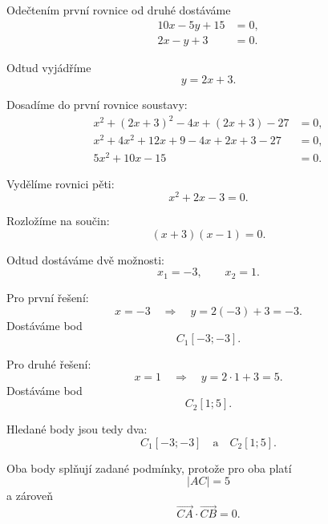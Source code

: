 \begin{example}
    Odečtením první rovnice od druhé dostáváme
    \begin{align*}
        10x-5y+15&=0,\\
        2x-y+3&=0.
    \end{align*}

    Odtud vyjádříme
    \[
        y=2x+3.
    \]

    Dosadíme do první rovnice soustavy:
    \begin{align*}
        x^2+(2x+3)^2-4x+(2x+3)-27&=0,\\
        x^2+4x^2+12x+9-4x+2x+3-27&=0,\\
        5x^2+10x-15&=0.
    \end{align*}

    Vydělíme rovnici pěti:
    \[
        x^2+2x-3=0.
    \]

    Rozložíme na součin:
    \[
        (x+3)(x-1)=0.
    \]

    Odtud dostáváme dvě možnosti:
    \[
        x_1=-3,
        \qquad
        x_2=1.
    \]

    Pro první řešení:
    \[
        x=-3
        \quad\Longrightarrow\quad
        y=2(-3)+3=-3.
    \]
    Dostáváme bod
    \[
        C_1[-3;-3].
    \]

    Pro druhé řešení:
    \[
        x=1
        \quad\Longrightarrow\quad
        y=2\cdot1+3=5.
    \]
    Dostáváme bod
    \[
        C_2[1;5].
    \]

    Hledané body jsou tedy dva:
    \[
        C_1[-3;-3]\quad\text{a}\quad C_2[1;5].
    \]

    Oba body splňují zadané podmínky, protože pro oba platí
    \[
        |AC|=5
    \]
    a zároveň
    \[
        \overrightarrow{CA}\cdot\overrightarrow{CB}=0.
    \]

    \begin{figure}[H]
        \centering
\end{figure}
\end{example}
